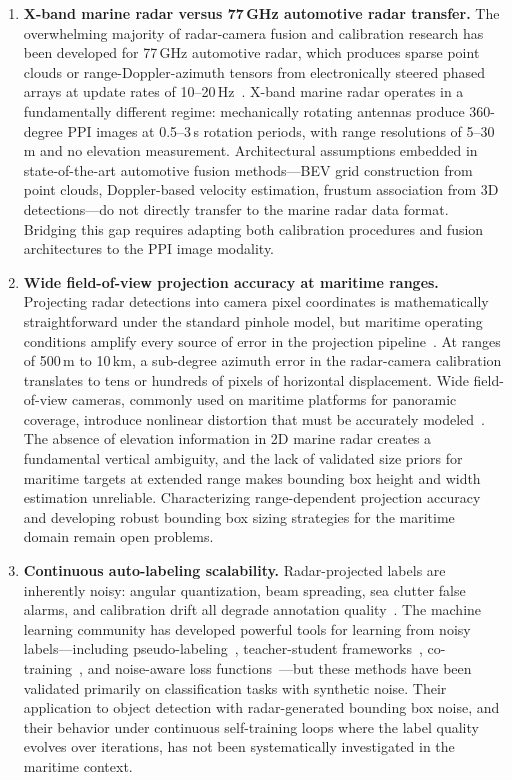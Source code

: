 \begin{enumerate}[leftmargin=*]

\item \textbf{X-band marine radar versus 77\,GHz automotive radar transfer.}
The overwhelming majority of radar-camera fusion and calibration research has been developed for 77\,GHz automotive radar, which produces sparse point clouds or range-Doppler-azimuth tensors from electronically steered phased arrays at update rates of 10--20\,Hz~\cite{sengupta2024comprehensive,Shi2024RadarCameraSurvey}. X-band marine radar operates in a fundamentally different regime: mechanically rotating antennas produce 360-degree PPI images at 0.5--3\,s rotation periods, with range resolutions of 5--30\,m and no elevation measurement. Architectural assumptions embedded in state-of-the-art automotive fusion methods---BEV grid construction from point clouds, Doppler-based velocity estimation, frustum association from 3D detections---do not directly transfer to the marine radar data format. Bridging this gap requires adapting both calibration procedures and fusion architectures to the PPI image modality.

\item \textbf{Wide field-of-view projection accuracy at maritime ranges.}
Projecting radar detections into camera pixel coordinates is mathematically straightforward under the standard pinhole model, but maritime operating conditions amplify every source of error in the projection pipeline~\cite{persic2019extrinsic,sengupta2024comprehensive}. At ranges of 500\,m to 10\,km, a sub-degree azimuth error in the radar-camera calibration translates to tens or hundreds of pixels of horizontal displacement. Wide field-of-view cameras, commonly used on maritime platforms for panoramic coverage, introduce nonlinear distortion that must be accurately modeled~\cite{kannala2006generic,scaramuzza2006toolbox}. The absence of elevation information in 2D marine radar creates a fundamental vertical ambiguity, and the lack of validated size priors for maritime targets at extended range makes bounding box height and width estimation unreliable. Characterizing range-dependent projection accuracy and developing robust bounding box sizing strategies for the maritime domain remain open problems.

\item \textbf{Continuous auto-labeling scalability.}
Radar-projected labels are inherently noisy: angular quantization, beam spreading, sea clutter false alarms, and calibration drift all degrade annotation quality~\cite{song2022learning,ratner2016data}. The machine learning community has developed powerful tools for learning from noisy labels---including pseudo-labeling~\cite{lee2013pseudo,xie2020self}, teacher-student frameworks~\cite{tarvainen2017mean}, co-training~\cite{blum1998combining}, and noise-aware loss functions~\cite{patrini2017making,zhang2018generalized}---but these methods have been validated primarily on classification tasks with synthetic noise. Their application to object detection with radar-generated bounding box noise, and their behavior under continuous self-training loops where the label quality evolves over iterations, has not been systematically investigated in the maritime context.


\end{enumerate}
